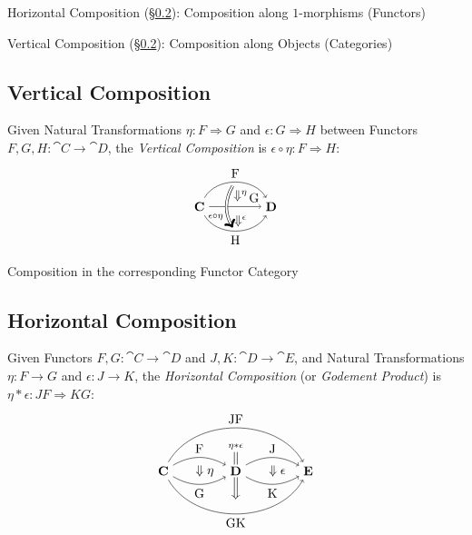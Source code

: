 Horizontal Composition (\S\ref{sec:horizontal_composition}):
Composition along $1$-morphisms (Functors)

Vertical Composition (\S\ref{sec:horizontal_composition}):
Composition along Objects (Categories)



\subsection{Vertical Composition}\label{sec:vertical_composition}

Given Natural Transformations $\eta : F \Rightarrow G$ and $\epsilon :
G \Rightarrow H$ between Functors $F,G,H : \cat{C} \rightarrow
\cat{D}$, the \emph{Vertical Composition} is $\epsilon\circ\eta : F
\Rightarrow H$:
\[
  \begin{tikzpicture}
    \node (C) at (-1,0) {$\cat{C}$};
    \node (D) at (1,0) {$\cat{D}$};
    \node (N) at (0,0.3) {$\;\;\;\Downarrow^\eta$};
    \node (M) at (0,-0.4) {$\;\;\;\Downarrow^\epsilon$};
    \node (F) at (0,0.7) {};
    \node (H) at (0,-0.7) {};
    \draw[->,bend left=60] (C) to node [above] {F} (D);
    \draw[->] (C) to node [above] {\quad\quad\quad G} (D);
    \draw[->,bend right=60] (C) to node [below] {H} (D);
    \draw[->,bend right=30,double distance=1.5pt] (F) to
      node [left,pos=0.75] {$_{\epsilon\circ\eta}$} (H);
  \end{tikzpicture}
\]

Composition in the corresponding Functor Category



\subsection{Horizontal Composition}\label{sec:horizontal_composition}

Given Functors $F,G : \cat{C} \rightarrow \cat{D}$ and $J,K : \cat{D}
\rightarrow \cat{E}$, and Natural Transformations $\eta : F
\rightarrow G$ and $\epsilon : J \rightarrow K$, the \emph{Horizontal
  Composition} (or \emph{Godement Product}) is $\eta * \epsilon : JF
\Rightarrow KG$:
\[
  \begin{tikzpicture}
    \node (U) at (0,0) {$\stackrel{\eta*\epsilon}
      {\stackrel{\Big\|}{\Big\Downarrow}}$};
    \node [fill,color=white,scale=1.5] (W) at (0,0) {};
    \node (C) at (-2,0) {$\cat{C}$};
    \node (D) at (0,0) {$\cat{D}$};
    \node (E) at (2,0) {$\cat{E}$};
    \node (S) at (-1,0) {$\;\;\;\Downarrow\eta$};
    \node (T) at (1,0) {$\;\;\;\Downarrow\epsilon$};
    \draw[->,bend left] (C) to node [above] {F} (D);
    \draw[->,bend right] (C) to node [below] {G} (D);
    \draw[->,bend left] (D) to node [above] {J} (E);
    \draw[->,bend right] (D) to node [below] {K} (E);
    \draw[->,bend left=60] (C) to node [above] {JF} (E);
    \draw[->,bend right=60] (C) to node [below] {GK} (E);
  \end{tikzpicture}
\]

